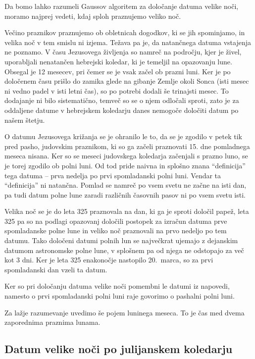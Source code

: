 \documentclass[a4paper,12pt]{article}
\begin{document}
Da bomo lahko razumeli Gaussov algoritem za določanje datuma velike noči, 
moramo najprej vedeti, kdaj sploh praznujemo veliko noč. 

Večino praznikov praznujemo ob obletnicah dogodkov, ki se jih spominjamo, in 
velika noč v tem smislu ni izjema. Težava pa je, da natančnega datuma vstajenja %
ne poznamo. V času Jezusovega življenja so namreč na področju, kjer je živel, 
uporabljali nenatančen hebrejski koledar, ki je temeljil na opazovanju lune. 
Obsegal je 12 mesecev, pri čemer se je vsak začel ob prazni luni. Ker je po 
določenem času prišlo do zamika glede na gibanje Zemlje okoli Sonca (isti mesec 
ni vedno padel v isti letni čas), so po potrebi dodali še trinajsti mesec. To 
dodajanje ni bilo sistematično, temveč so se o njem odločali sproti, zato je za 
oddaljene datume v hebrejskem koledarju danes nemogoče določiti datum po našem 
štetju. \cite{calendar}

O datumu Jezusovega križanja se je ohranilo le to, da se je zgodilo v petek tik 
pred pasho, judovskim praznikom, ki so ga začeli praznovati 15. dne 
pomladnega meseca nisana. Ker so se meseci judovskega koledarja začenjali s 
prazno luno, se je torej zgodilo ob polni luni. Od tod pride naivna in splošno 
znana ``definicija'' tega datuma -- prva nedelja po prvi spomladanski polni 
luni. Vendar ta ``definicija'' ni natančna. Pomlad se namreč po vsem svetu ne 
začne na isti dan, pa tudi datum polne lune zaradi različnih časovnih pasov ni 
po vsem svetu isti. \cite{encyclopedia,zentralratderjuden,calendar}

Velika noč se je do leta 325 praznovala na dan, ki ga je sproti določil papež, 
leta 325 pa so na podlagi opazovanj določili postopek za izračun datuma prve 
spomladanske polne lune in veliko noč praznovali na prvo nedeljo po tem datumu. 
Tako določeni datumi polnih lun se največkrat ujemajo z dejanskim datumom 
astronomske polne lune, v splošnem pa od njega ne odstopajo za več kot 3 dni. 
Ker je leta 325 enakonočje nastopilo 20.\ marca, so za prvi spomladanski dan 
vzeli ta datum. %

Ker so pri določanju datuma velike noči pomembni le datumi iz napovedi, 
namesto o prvi spomladanski polni luni raje govorimo o pashalni polni luni.

Za lažje razumevanje uvedimo še pojem luninega meseca. To je čas med dvema 
zaporednima praznima lunama. %

\subsection*{Datum velike noči po julijanskem koledarju}
\end{document}
